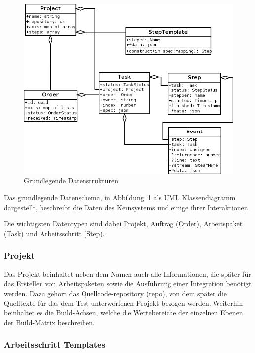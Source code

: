 \begin{figure}[ht] 
  \centering
  \label{fig:datenstrukturen}
  \includegraphics[width=\textwidth]{imageinput/datenstrukturen-step-templates.png}
  \caption{Grundlegende Datenstrukturen}
\end{figure}

Das grundlegende Datenschema, in Abbildung~\ref{fig:datenstrukturen} als UML Klassendiagramm dargestellt,
beschreibt die Daten des Kernsystems und einige ihrer Interaktionen.

Die wichtigsten Datentypen sind dabei Projekt, Auftrag (Order),
Arbeitspaket (Task) und Arbeitsschritt (Step).

\subsubsection{Projekt}

Das Projekt beinhaltet neben dem Namen auch alle Informationen,
die später für das Erstellen von Arbeitspaketen sowie
die Ausführung einer Integration benötigt werden.
Dazu gehört das Quellcode-repository (repo), von dem später
die Quelltexte für das dem Test unterworfenen Projekt bezogen werden.
Weiterhin beinhaltet es die Build-Achsen,
welche die Wertebereiche der einzelnen Ebenen der Build-Matrix
beschreiben.

\subsubsection{Arbeitsschritt Templates}

